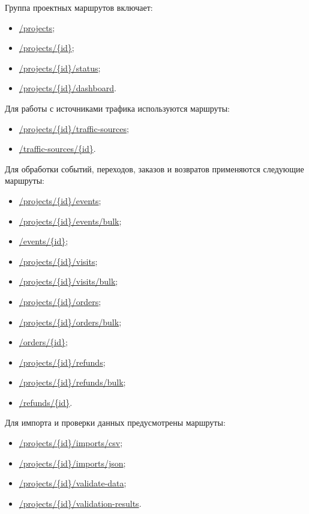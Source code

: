 Группа проектных маршрутов включает:
\begin{itemize}[leftmargin=1.25cm]
    \item \url{/projects};
    \item \url{/projects/\{id\}};
    \item \url{/projects/\{id\}/status};
    \item \url{/projects/\{id\}/dashboard}.
\end{itemize}

Для работы с источниками трафика используются маршруты:
\begin{itemize}[leftmargin=1.25cm]
    \item \url{/projects/\{id\}/traffic-sources};
    \item \url{/traffic-sources/\{id\}}.
\end{itemize}

Для обработки событий, переходов, заказов и возвратов применяются следующие маршруты:
\begin{itemize}[leftmargin=1.25cm]
    \item \url{/projects/\{id\}/events};
    \item \url{/projects/\{id\}/events/bulk};
    \item \url{/events/\{id\}};
    \item \url{/projects/\{id\}/visits};
    \item \url{/projects/\{id\}/visits/bulk};
    \item \url{/projects/\{id\}/orders};
    \item \url{/projects/\{id\}/orders/bulk};
    \item \url{/orders/\{id\}};
    \item \url{/projects/\{id\}/refunds};
    \item \url{/projects/\{id\}/refunds/bulk};
    \item \url{/refunds/\{id\}}.
\end{itemize}

Для импорта и проверки данных предусмотрены маршруты:
\begin{itemize}[leftmargin=1.25cm]
    \item \url{/projects/\{id\}/imports/csv};
    \item \url{/projects/\{id\}/imports/json};
    \item \url{/projects/\{id\}/validate-data};
    \item \url{/projects/\{id\}/validation-results}.
\end{itemize}

